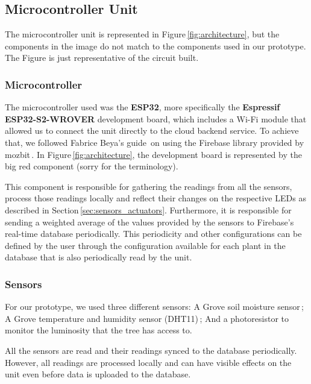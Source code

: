 \documentclass{article}
\begin{document}
\subsection{Microcontroller Unit}
The microcontroller unit is represented in Figure\,\ref{fig:architecture}, but
the components in the image do not match to the components used in our
prototype. The Figure is just representative of the circuit built.



\subsubsection{Microcontroller}
The microcontroller used was the \textbf{ESP32}, more specifically the
\textbf{Espressif ESP32-S2-WROVER} development board, which includes a Wi-Fi
module that allowed us to connect the unit directly to the cloud backend
service. To achieve that, we followed Fabrice Beya's
guide\,\cite{firebase_esp32} on using the Firebase library provided by
mozbit\,\cite{mozbit}. In Figure\,\ref{fig:architecture}, the development board
is represented by the big red component (sorry for the terminology).

This component is responsible for gathering the readings from all the sensors,
process those readings locally and reflect their changes on the respective LEDs
as described in Section\,\ref{sec:sensors_actuators}. Furthermore, it is
responsible for sending a weighted average of the values provided by the sensors
to Firebase's real-time database periodically. This periodicity and other
configurations can be defined by the user through the configuration available
for each plant in the database that is also periodically read by the unit.


\subsubsection{Sensors}
For our prototype, we used three different sensors: A Grove soil moisture
sensor\,\cite{sensor_moisture}; A Grove temperature and humidity sensor
(DHT11)\,\cite{sensor_dht11}; And a photoresistor to monitor the luminosity that
the tree has access to.

All the sensors are read  and their readings synced to the database
periodically. However, all readings are processed locally and can have visible
effects on the unit even before data is uploaded to the database.
\end{document}
